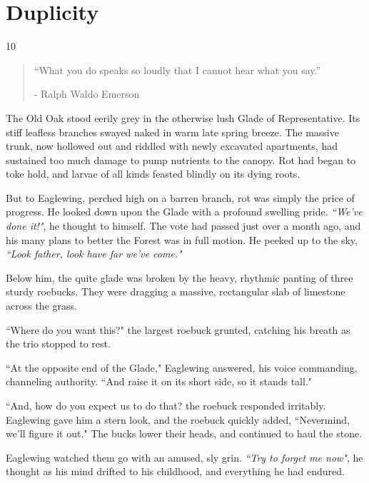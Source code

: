 \chapter{Duplicity} %

\vspace{-1.3cm}
\begin{localsize}{10}
    \begin{quote}
        “What you do speaks so loudly that I cannot hear what you say.”
        \begin{flushright}- Ralph Waldo Emerson \end{flushright}
    \end{quote}
\end{localsize}
\vspace{1cm}


The Old Oak stood eerily grey in the otherwise lush Glade of Representative. Its stiff leafless branches swayed naked in warm late spring breeze. The massive trunk, now hollowed out and riddled with newly excavated apartments, had sustained too much damage to pump nutrients to the canopy. Rot had began to toke hold, and larvae of all kinds feasted blindly on its dying roots.

But to Eaglewing, perched high on a barren branch, rot was simply the price of progress.
He looked down upon the Glade with a profound swelling pride. \textit{``We've done it!"}, he thought to himself. The vote had passed just over a month ago, and his many plans to better the Forest was in full motion. He peeked up to the sky, \textit{``Look father, look have far we've come."}

Below him, the quite glade was broken by the heavy, rhythmic panting of three sturdy roebucks. They were dragging a massive, rectangular slab of limestone across the grass.

``Where do you want this?" the largest roebuck grunted, catching his breath as the trio stopped to rest.

``At the opposite end of the Glade," Eaglewing answered, his voice commanding, channeling authority. ``And raise it on its short side, so it stands tall."

``And, how do you expect us to do that? the roebuck responded irritably. Eaglewing gave him a stern look, and the roebuck quickly added, ``Nevermind, we'll figure it out." The bucks lower their heads, and continued to haul the stone.

Eaglewing watched them go with an amused, sly grin. \textit{``Try to forget me now"}, he thought as his mind drifted to his childhood, and everything he had endured. \\

